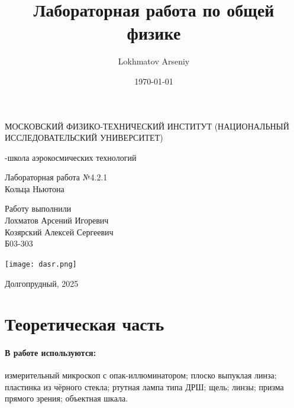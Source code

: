 \documentclass[a4paper,12pt]{article} %
\author{Lokhmatov Arseniy}
\title{Лабораторная работа по общей физике}
\date{\today}
\begin{document}
\begin{titlepage}
    \newpage
    \begin{center}
    {\large МОСКОВСКИЙ ФИЗИКО-ТЕХНИЧЕСКИЙ ИНСТИТУТ (НАЦИОНАЛЬНЫЙ ИССЛЕДОВАТЕЛЬСКИЙ УНИВЕРСИТЕТ)}
    \vspace{1cm}

    {-школа аэрокосмических технологий}
    \vspace{6em}
    \end{center}
    
    \vspace{1.2em}

    \begin{center}
    \Large Лабораторная работа №4.2.1 \\
    Кольца Ньютона
    \linebreak
    \end{center}
    
    \vspace{11em}
    
    \begin{flushright}
                       {\large Работу выполнили\\
                       Лохматов Арсений Игоревич\\
                       Козярский Алексей Сергеевич\\
                       Б03-303 }
    \end{flushright}

    \vspace{\fill}

    \begin{center}
        \texttt{[image: dasr.png]}
    \end{center}

    \begin{center}
    Долгопрудный, 2025
    \end{center}

    \end{titlepage}

\section{Теоретическая часть}

\paragraph{В работе используются: } измерительный микроскоп с опак-иллюминатором; плоско выпуклая линза; пластинка из чёрного стекла; ртутная лампа типа ДРШ; щель; линзы; призма прямого зрения; объектная шкала.
\end{document}
